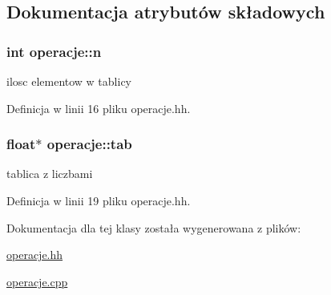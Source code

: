 \subsection{Dokumentacja atrybutów składowych}
\hypertarget{classoperacje_aec7cc301d8822128d918aa1f9c7e1db2}{
\subsubsection[{n}]{\setlength{\rightskip}{0pt plus 5cm}int operacje\-::n}}\label{classoperacje_aec7cc301d8822128d918aa1f9c7e1db2}


ilosc elementow w tablicy 



Definicja w linii 16 pliku operacje.\-hh.

\hypertarget{classoperacje_ad23bc418eebc9b493a5494ffd9358dd0}{
\subsubsection[{tab}]{\setlength{\rightskip}{0pt plus 5cm}float$\ast$ operacje\-::tab}}\label{classoperacje_ad23bc418eebc9b493a5494ffd9358dd0}


tablica z liczbami 



Definicja w linii 19 pliku operacje.\-hh.



Dokumentacja dla tej klasy została wygenerowana z plików\-:\begin{DoxyCompactItemize}
\item 
\hyperlink{operacje_8hh}{operacje.\-hh}\item 
\hyperlink{operacje_8cpp}{operacje.\-cpp}\end{DoxyCompactItemize}
